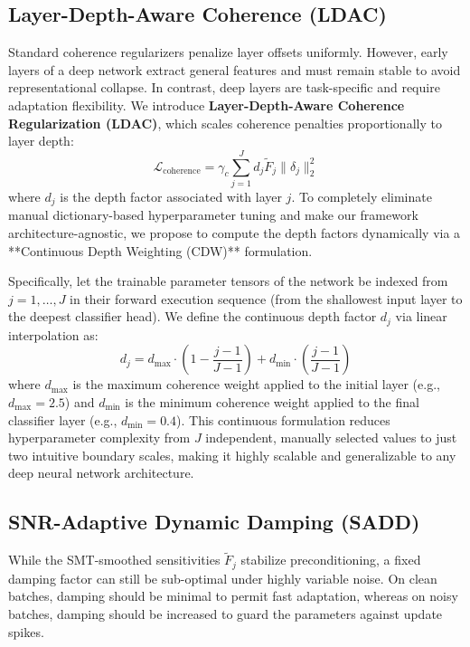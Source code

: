 \documentclass{article}
\theoremstyle{plain}
\theoremstyle{definition}
\theoremstyle{remark}
\begin{document}
\subsection{Layer-Depth-Aware Coherence (LDAC)}
Standard coherence regularizers penalize layer offsets uniformly. However, early layers of a deep network extract general features and must remain stable to avoid representational collapse. In contrast, deep layers are task-specific and require adaptation flexibility. We introduce \textbf{Layer-Depth-Aware Coherence Regularization (LDAC)}, which scales coherence penalties proportionally to layer depth:
\begin{equation}
    \mathcal{L}_{\text{coherence}} = \gamma_c \sum_{j=1}^J d_j \tilde{F}_j \|\delta_j\|_2^2
\end{equation}
where $d_j$ is the depth factor associated with layer $j$. To completely eliminate manual dictionary-based hyperparameter tuning and make our framework architecture-agnostic, we propose to compute the depth factors dynamically via a **Continuous Depth Weighting (CDW)** formulation. 

Specifically, let the trainable parameter tensors of the network be indexed from $j = 1, \dots, J$ in their forward execution sequence (from the shallowest input layer to the deepest classifier head). We define the continuous depth factor $d_j$ via linear interpolation as:
\begin{equation}
    d_j = d_{\text{max}} \cdot \left(1 - \frac{j - 1}{J - 1}\right) + d_{\text{min}} \cdot \left(\frac{j - 1}{J - 1}\right)
\end{equation}
where $d_{\text{max}}$ is the maximum coherence weight applied to the initial layer (e.g., $d_{\text{max}} = 2.5$) and $d_{\text{min}}$ is the minimum coherence weight applied to the final classifier layer (e.g., $d_{\text{min}} = 0.4$). This continuous formulation reduces hyperparameter complexity from $J$ independent, manually selected values to just two intuitive boundary scales, making it highly scalable and generalizable to any deep neural network architecture.

\subsection{SNR-Adaptive Dynamic Damping (SADD)}
While the SMT-smoothed sensitivities $\tilde{F}_j$ stabilize preconditioning, a fixed damping factor can still be sub-optimal under highly variable noise. On clean batches, damping should be minimal to permit fast adaptation, whereas on noisy batches, damping should be increased to guard the parameters against update spikes.
\end{document}
